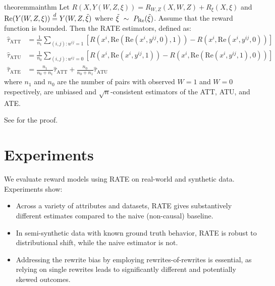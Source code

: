 \documentclass{article}
\begin{document}
\begin{restatable}{theorem}{mainthm}
\label{thm:mainthm}
  Let $R(X, Y(W,Z,\xi)) = R_{W, Z}(X, W, Z) + R_{\xi}(X, \xi)$ and $\text{Re}(Y(W, Z, \xi)) \overset{d}{=} Y(W, Z, \tilde{\xi})$ where $\tilde{\xi} \ \sim\  P_\text{Re}(\tilde{\xi})$. Assume that the reward function is bounded.
  Then the RATE estimators, defined as:
  \begin{align*}
  \hat{\tau}_{\text{ATT}} &= \frac{1}{n_1} \sum_{(i, j): w^{ij} = 1} [R(x^i, \text{Re}(\text{Re}(x^i, y^{ij}, 0), 1)) - R(x^i, \text{Re}(x^i, y^{ij}, 0))] \\
  \hat{\tau}_{\text{ATU}} &= \frac{1}{n_0} \sum_{(i,j): w^{ij} = 0} [R(x^i, \text{Re}(x^i, y^{ij}, 1)) - R(x^i, \text{Re}(\text{Re}(x^i, y^{ij}, 1), 0))] \\
  \hat{\tau}_{\text{ATE}} &= \frac{n_1}{n_0 + n_1} \hat{\tau}_{\text{ATT}} + \frac{n_0}{n_0 + n_1} \hat{\tau}_{\text{ATU}}
\end{align*}
where $n_1$ and $n_0$ are the number of pairs with observed $W = 1$ and $W = 0$ respectively, are unbiased and $\sqrt{n}$-consistent estimators of the ATT, ATU, and ATE.
\end{restatable}

See  for the proof.


\section{Experiments}
\label{sec:experiments}
We evaluate reward models using RATE on real-world and synthetic data. Experiments show:
\begin{itemize}
  \item Across a variety of attributes and datasets, RATE gives substantively different estimates compared to the naive (non-causal) baseline.
  \item In semi-synthetic data with known ground truth behavior, RATE is robust to distributional shift, while the naive estimator is not.
  \item Addressing the rewrite bias by employing rewrites-of-rewrites is essential, as relying on single rewrites leads to significantly different and potentially skewed outcomes.
\end{itemize}
\end{document}

